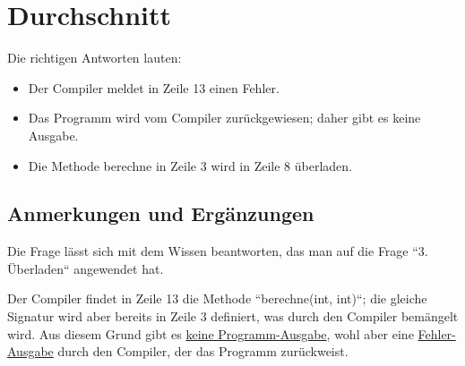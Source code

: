 \chapter{Durchschnitt}

Die richtigen Antworten lauten:

\begin{itemize}
    \item Der Compiler meldet in Zeile 13 einen Fehler.
    \item Das Programm wird vom Compiler zurückgewiesen; daher gibt es keine Ausgabe.
    \item Die Methode berechne in Zeile 3 wird in Zeile 8 überladen.
\end{itemize}


\section*{Anmerkungen und Ergänzungen}

Die Frage lässt sich mit dem Wissen beantworten, das man auf die Frage ``3. Überladen`` angewendet hat.

Der Compiler findet in Zeile 13 die Methode ``berechne(int, int)``; die gleiche Signatur wird aber bereits in Zeile 3
definiert, was durch den Compiler bemängelt wird. Aus diesem Grund gibt es \underline{keine Programm-Ausgabe}, wohl aber
eine \underline{Fehler-Ausgabe} durch den Compiler, der das Programm zurückweist.
